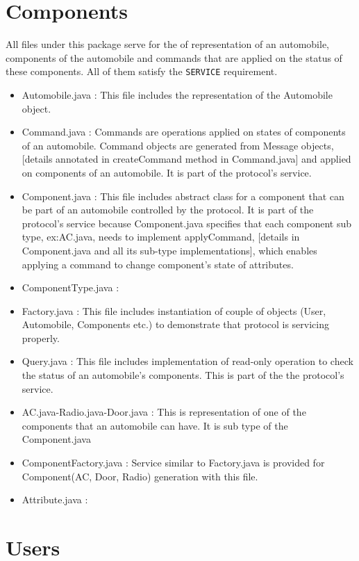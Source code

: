 \documentclass[12pt]{usenixsubmit}
\begin{document}
  \section{Components} All files under this package serve for the of representation of an automobile, components of the automobile and commands that are applied on the status of these components. All of them satisfy the {\tt SERVICE} requirement.
  \begin{itemize}
  \item Automobile.java : This file includes the representation of the Automobile object.
  \item Command.java : Commands are operations applied on states of components of an automobile. Command objects are generated from Message objects, [details annotated in \textsf{createCommand} method in Command.java] and applied on components of an automobile. It is part of the protocol's service.
  \item Component.java :  This file includes abstract class for a component that can be part of an automobile controlled by the protocol. It is part of the protocol's service because Component.java specifies that each component sub type, ex:AC.java, needs to implement \textsf{applyCommand}, [details in Component.java and all its sub-type implementations], which enables applying a command to change component's state of attributes. 
  \item ComponentType.java : 
  \item Factory.java : This file includes instantiation of couple of objects (User, Automobile, Components etc.) to demonstrate that protocol is servicing properly.
  \item Query.java : This file includes implementation of read-only operation to check the status of an automobile's components. This is part of the the protocol's service.
  \item AC.java-Radio.java-Door.java  : This is representation of one of the components that an automobile can have. It is sub type of the Component.java
  \item ComponentFactory.java : Service similar to Factory.java is provided for Component(AC, Door, Radio) generation with this file.
  \item Attribute.java :
  \end{itemize}
  
  \section{Users}
\end{document}
